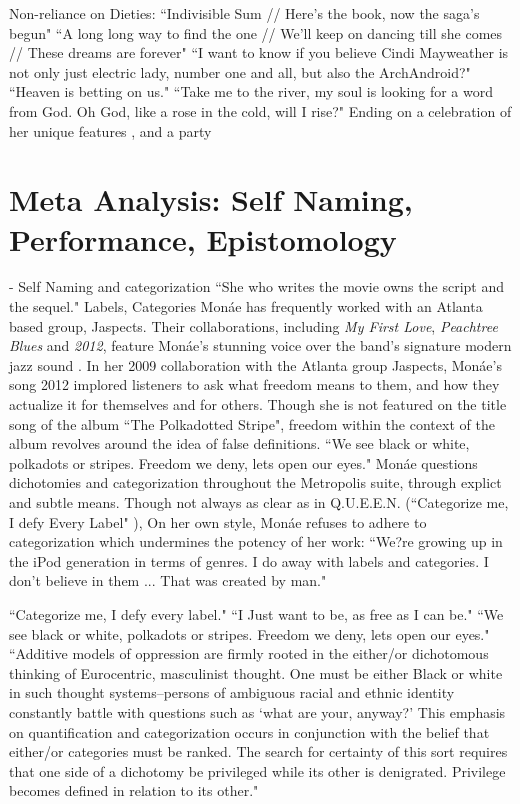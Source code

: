 \documentclass[a4paper, 11pt]{article} %
\begin{document}
Non-reliance on Dieties:
``Indivisible Sum // Here's the book, now the saga's begun" \cite{fiveseveneighttwoone}
``A long long way to find the one // We'll keep on dancing till she comes // These dreams are forever" \cite{danceordie}
``I want to know if you believe Cindi Mayweather is not only just electric lady, number one and all, but also the ArchAndroid?" \cite{favoritefugitive}
``Heaven is betting on us." \cite{primetime}
``Take me to the river, my soul is looking for a word from God. Oh God, like a rose in the cold, will I rise?" \cite{sallyride}
Ending on a celebration of her unique features \cite{dandridgeeyes}, and a party \cite{whatanexperience}


\section*{Meta Analysis: Self Naming, Performance, Epistomology}

- Self Naming and categorization
``She who writes the movie owns the script and the sequel." \cite{queen}
Labels, Categories
Mon\'ae has frequently worked with an Atlanta based group, Jaspects.
Their collaborations, including \emph{My First Love}, \emph{Peachtree Blues} and \emph{2012}, feature Mon\'ae's stunning voice over the band's signature modern jazz sound \cite{peachtreeblues} \cite{myfirstlove}.
In her 2009 collaboration with the Atlanta group Jaspects, Mon\'ae's song 2012 implored listeners to ask what freedom means to them, and how they actualize it for themselves and for others.
Though she is not featured on the title song of the album ``The Polkadotted Stripe", freedom within the context of the album revolves around the idea of false definitions.
``We see black or white, polkadots or stripes. Freedom we deny, lets open our eyes." \cite{polkadottedstripe}
Mon\'ae questions dichotomies and categorization throughout the Metropolis suite, through explict and subtle means.
Though not always as clear as in Q.U.E.E.N. (``Categorize me, I defy Every Label" \cite{queen}), 
On her own style, Mon\'ae refuses to adhere to categorization which undermines the potency of her work:
``We?re growing up in the iPod generation in terms of genres. I do away with labels and categories. I don't believe in them ... That was created by man." \cite{joeyguerra2010}


``Categorize me, I defy every label." \cite{queen}
``I Just want to be, as free as I can be." \cite{polkadottedstripe}
``We see black or white, polkadots or stripes. Freedom we deny, lets open our eyes." \cite{polkadottedstripe}
``Additive models of oppression are firmly rooted in the either/or dichotomous thinking of Eurocentric, masculinist thought. One must be either Black or white in such thought systems--persons of ambiguous racial and ethnic identity constantly battle with questions such as `what are your, anyway?' This emphasis on quantification and categorization occurs in conjunction with the belief that either/or categories must be ranked. The search for certainty of this sort requires that one side of a dichotomy be privileged while its other is denigrated. Privilege becomes defined in relation to its other." \cite{collins2009}
\end{document}
